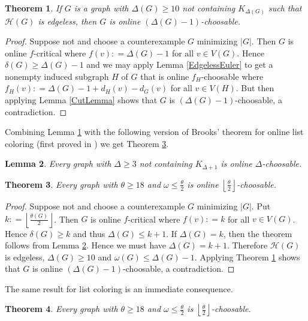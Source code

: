 \documentclass[12pt]{article}
\theoremstyle{plain}
\newtheorem{thm}{Theorem}[section]
\newtheorem{lem}[thm]{Lemma}
\theoremstyle{definition}
\theoremstyle{remark}
\newcommand{\fancy}[1]{\mathcal{#1}}
\newcommand{\HH}{\fancy{H}}
\newcommand{\card}[1]{\left|#1\right|}
\newcommand{\floor}[1]{\left\lfloor#1\right\rfloor}
\newcommand{\DefinedAs}{\mathrel{\mathop:}=}
\begin{document}
\begin{thm}\label{EdgelessOnlineEuler}
If $G$ is a graph with $\Delta(G) \geq 10$ not containing $K_{\Delta(G)}$ such that $\HH(G)$ is edgeless, then $G$ is online $(\Delta(G)-1)$-choosable.
\end{thm}
\begin{proof}
Suppose not and choose a counterexample $G$ minimizing $\card{G}$. Then $G$ is online $f$-critical where $f(v) \DefinedAs \Delta(G) - 1$ for all $v \in V(G)$.  Hence $\delta(G) \geq \Delta(G) - 1$ and we may apply Lemma \ref{EdgelessEuler} to get a nonempty induced subgraph $H$ of $G$ that is online $f_H$-choosable where $f_H(v) \DefinedAs \Delta(G) - 1 + d_H(v) - d_G(v)$ for all $v \in V(H)$.  But then applying Lemma \ref{CutLemma} shows that $G$ is $(\Delta(G)-1)$-choosable, a contradiction.
\end{proof}

Combining Lemma \ref{EdgelessOnlineEuler} with the following version of Brooks' theorem for online list coloring (first proved in \cite{Hladky}) we get Theorem \ref{OurListOnlineOre}.

\begin{lem}\label{BrooksOnline}
Every graph with $\Delta \geq 3$ not containing $K_{\Delta+1}$ is online $\Delta$-choosable.
\end{lem}

\begin{thm}\label{OurListOnlineOre}
Every graph with $\theta \geq 18$ and $\omega \leq \frac{\theta}{2}$ is online $\floor{\frac{\theta}{2}}$-choosable.
\end{thm}
\begin{proof}
Suppose not and choose a counterexample $G$ minimizing $\card{G}$.  Put $k \DefinedAs \floor{\frac{\theta(G)}{2}}$. Then $G$ is online $f$-critical where $f(v) \DefinedAs k$ for all $v \in V(G)$.  Hence $\delta(G) \geq k$ and thus $\Delta(G) \leq k + 1$. If $\Delta(G) = k$, then the theorem follows from Lemma \ref{BrooksOnline}. Hence we must have $\Delta(G) = k + 1$. Therefore $\HH(G)$ is edgeless, $\Delta(G) \geq 10$ and $\omega(G) \leq \Delta(G) - 1$.  Applying Theorem \ref{EdgelessOnlineEuler} shows that $G$ is online $(\Delta(G)-1)$-choosable, a contradiction.
\end{proof}

The same result for list coloring is an immediate consequence.

\begin{thm}\label{OurListOre}
Every graph with $\theta \geq 18$ and $\omega \leq \frac{\theta}{2}$ is $\floor{\frac{\theta}{2}}$-choosable.
\end{thm}



\end{document}
